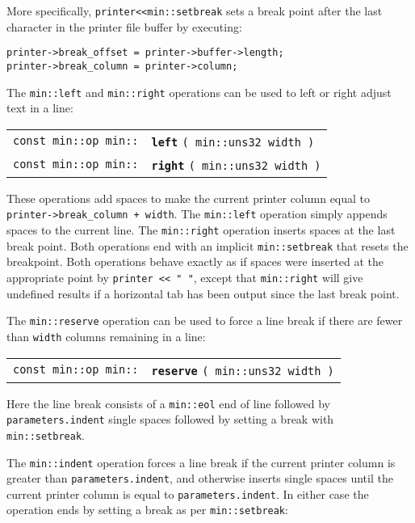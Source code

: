 \documentclass[12pt]{article}
\makeatletter
\newcommand{\ttindex}[1]{\index{#1@{\tt #1}}}
\newcommand{\minindex}[1]{\ttindex{min::#1}\ttindex{#1}}
\newcommand{\EOL}{\penalty \exhyphenpenalty}
\newenvironment{indpar}[1][0.3in]%
	{\begin{list}{}%
		     {\setlength{\itemsep}{0in}%
		      \setlength{\topsep}{0in}%
		      \setlength{\parsep}{1ex}%
		      \setlength{\labelwidth}{#1}%
		      \setlength{\leftmargin}{#1}%
		      \addtolength{\leftmargin}{\labelsep}}%
	 \item}%
	{\end{list}}
\newcommand{\LABEL}[1]{\label{#1}}
\newcommand{\MINKEY}[1]{{\tt \bf #1}\minindex{#1}}
\makeatother
\begin{document}
More specifically, {\tt printer<<min::setbreak} sets a break point after
the last character in the printer file buffer by executing:
\begin{indpar}\begin{verbatim}
printer->break_offset = printer->buffer->length;
printer->break_column = printer->column;
\end{verbatim}\end{indpar}

The {\tt min::left} and {\tt min::right} operations can be used to
left or right adjust text in a line:

\begin{indpar}[1em]\begin{tabular}{r@{}l}
\verb|const min::op min::| & \MINKEY{left} \verb|( min::uns32 width )|
\LABEL{MIN::LEFT} \\
\verb|const min::op min::| & \MINKEY{right} \verb|( min::uns32 width )|
\LABEL{MIN::RIGHT} \\
\end{tabular}\end{indpar}

These operations add spaces to make the current printer column
equal to {\tt printer->\EOL break\_\EOL column + width}.
The {\tt min::\EOL left} operation simply appends spaces to the
current line.  The {\tt min::\EOL right} operation inserts spaces
at the last break point.  Both operations end with an implicit
{\tt min::\EOL setbreak} that resets the breakpoint.
Both operations behave exactly as if spaces were inserted at the
appropriate point by {\tt printer << "~"}, except that
{\tt min::right} will give undefined results if a horizontal
tab has been output since the last break point.

The {\tt min::reserve} operation can be used to
force a line break if there are fewer than {\tt width}
columns remaining in a line:

\begin{indpar}[1em]\begin{tabular}{r@{}l}
\verb|const min::op min::| & \MINKEY{reserve} \verb|( min::uns32 width )|
\LABEL{MIN::RESERVE} \\
\end{tabular}\end{indpar}

Here the line break consists of a {\tt min::eol} end of line followed
by {\tt parameters.indent} single spaces followed by setting a break
with {\tt min::\EOL setbreak}.

The {\tt min::indent} operation forces a line break if the current
printer column is greater than {\tt parameters.indent}, and otherwise inserts
single spaces until the current printer column is equal to
{\tt parameters.indent}.  In either case the operation
ends by setting a break as per {\tt min::setbreak}:
\end{document}
